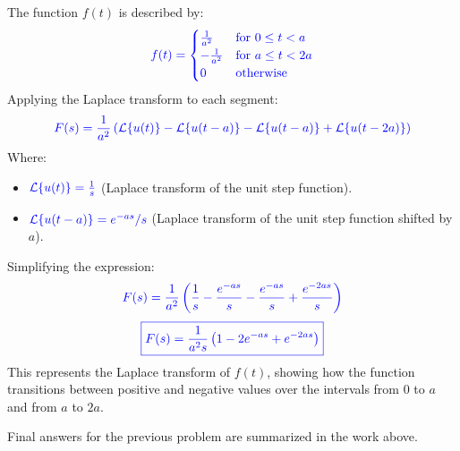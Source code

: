 \documentclass[12pt]{article}
\begin{document}
\begin{center}
\end{center}
The function \( f(t) \) is described by:
\[
	\textcolor{blue}{f(t) = \begin{cases} 
		\frac{1}{a^2} & \text{for } 0 \leq t < a \\
		-\frac{1}{a^2} & \text{for } a \leq t < 2a \\
		0 & \text{otherwise}
		\end{cases}}
\]
Applying the Laplace transform to each segment:
\[
	\textcolor{blue}{F(s) = \frac{1}{a^2} \left( \mathcal{L}\{u(t)\} - \mathcal{L}\{u(t-a)\} - \mathcal{L}\{u(t-a)\} + \mathcal{L}\{u(t-2a)\} \right)}
\]
Where:
\begin{itemize}
	\item \(\textcolor{blue}{\mathcal{L}\{u(t)\} = \frac{1}{s}}\) (Laplace transform of the unit step function).
	\item \(\textcolor{blue}{\mathcal{L}\{u(t-a)\} = e^{-as}/s}\) (Laplace transform of the unit step function shifted by \( a \)).
\end{itemize}
Simplifying the expression:
\[
	\textcolor{blue}{F(s) = \frac{1}{a^2} \left( \frac{1}{s} - \frac{e^{-as}}{s} - \frac{e^{-as}}{s} + \frac{e^{-2as}}{s} \right)}
\]
\[
	\textcolor{blue}{\boxed{F(s) = \frac{1}{a^2 s} \left( 1 - 2e^{-as} + e^{-2as} \right)}}
\]
This represents the Laplace transform of \( f(t) \), showing how the function transitions between positive and negative values over the intervals from 0 to \( a \) and from \( a \) to \( 2a \).


\newpage
\begin{resultsbox}
Final answers for the previous problem are summarized in the work above.
\end{resultsbox}
\end{document}

